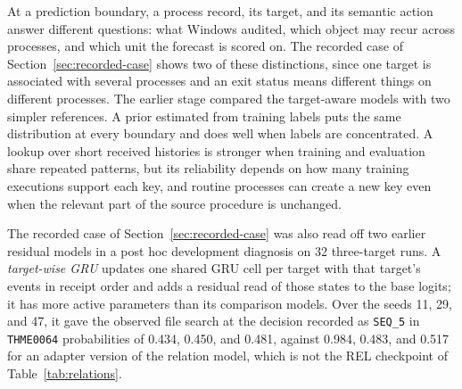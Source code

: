 At a prediction boundary, a process record, its target, and its semantic
action answer different questions: what Windows audited, which object
may recur across processes, and which unit the forecast is scored on.
The recorded case of Section~\ref{sec:recorded-case} shows two of
these distinctions, since one target is associated with several processes and
an exit status means different things on different processes. The
earlier stage compared the target-aware models with two simpler
references. A prior estimated from training labels puts the same
distribution at every boundary and does well when labels are
concentrated. A lookup over short received histories is stronger when
training and evaluation share repeated patterns, but its reliability
depends on how many training executions support each key, and routine
processes can create a new key even when the relevant part of the
source procedure is unchanged.

The recorded case of Section~\ref{sec:recorded-case} was also read
off two earlier residual models in a post hoc development diagnosis on
32 three-target runs. A \emph{target-wise GRU} updates one shared GRU
cell per target with that target's events in receipt order and adds a
residual read of those states to the base logits; it has more active
parameters than its comparison models. Over the seeds 11, 29, and 47,
it gave the observed file search at the decision recorded as
\texttt{SEQ\_5} in \texttt{THME0064} probabilities of 0.434, 0.450, and 0.481, against
0.984, 0.483, and 0.517 for an adapter version of the relation model,
which is not the REL checkpoint of Table~\ref{tab:relations}.

